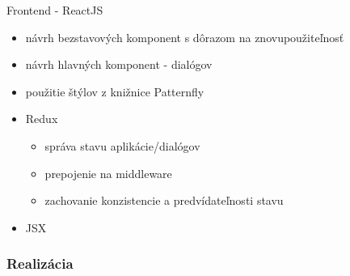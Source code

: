 \documentclass[pdf]{beamer}
\begin{document}
\begin{frame}

\begin{block}{Frontend - ReactJS}
\begin{itemize}
\item návrh bezstavových komponent s dôrazom na znovupoužiteľnosť
\item návrh hlavných komponent - dialógov
\item použitie štýlov z knižnice Patternfly
\item Redux 

\begin{itemize}
\item správa stavu aplikácie/dialógov
\item prepojenie na middleware
\item zachovanie konzistencie a predvídateľnosti stavu
\end{itemize}

\item JSX 
\end{itemize}
\end{block}

\end{frame}

\begin{frame}
\frametitle{Realizácia}

\begin{figure}[h]
\label{labelledSelect}
\end{figure} 

\end{frame}
\end{document}
